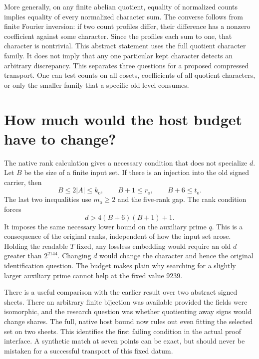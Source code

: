 \documentclass[12pt,letterpaper]{article}
\begin{document}
More generally, on any finite abelian quotient, equality of normalized counts implies equality of every normalized character sum. The converse follows from finite Fourier inversion: if two count profiles differ, their difference has a nonzero coefficient against some character. Since the profiles each sum to one, that character is nontrivial. This abstract statement uses the full quotient character family. It does not imply that any one particular kept character detects an arbitrary discrepancy. This separates three questions for a proposed compressed transport. One can test counts on all cosets, coefficients of all quotient characters, or only the smaller family that a specific old level consumes.


\section{How much would the host budget have to change?}
The native rank calculation gives a necessary condition that does not specialize $d$. Let $B$ be the size of a finite input set. If there is an injection into the old signed carrier, then
\[
 B\le2|A|\le k_{\mathrm o},\qquad
 B+1\le r_{\mathrm o},\qquad
 B+6\le t_{\mathrm o}.
\]
The last two inequalities use $m_{\mathrm o}\ge2$ and the five-rank gap. The rank condition forces
\[
                  d>4(B+6)(B+1)+1.
\]
It imposes the same necessary lower bound on the auxiliary prime $q$. This is a consequence of the original ranks, independent of how the input set arose. Holding the readable $T$ fixed, any lossless embedding would require an old $d$ greater than $2^{2144}$. Changing $d$ would change the character and hence the original identification question. The budget makes plain why searching for a slightly larger auxiliary prime cannot help at the fixed value 9239.

There is a useful comparison with the earlier result over two abstract signed sheets. There an arbitrary finite bijection was available provided the fields were isomorphic, and the research question was whether quotienting away signs would change shares. The full, native host bound now rules out even fitting the selected set on two sheets. This identifies the first failing condition in the actual proof interface. A synthetic match at seven points can be exact, but should never be mistaken for a successful transport of this fixed datum.
\end{document}
